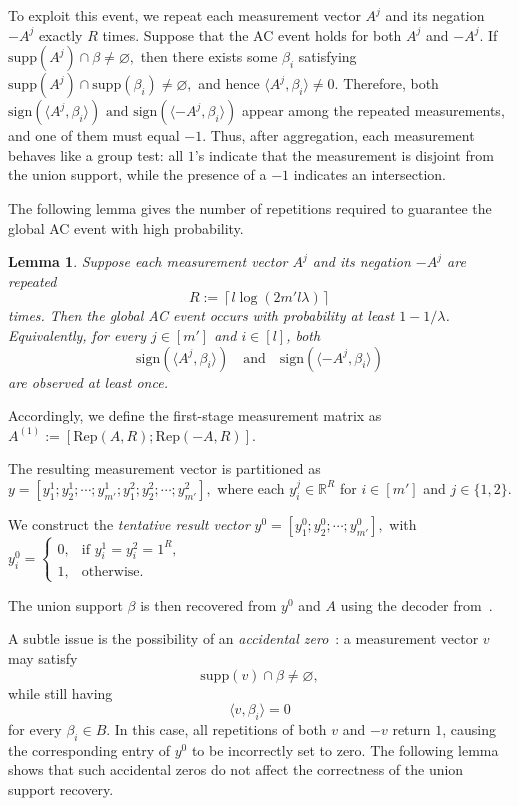 \documentclass{article}
\newtheorem{lemma}{Lemma}[section]
\newcommand{\supp}{\mathrm{supp}}
\newcommand{\sign}{\mathrm{sign}}
\begin{document}
To exploit this event, we repeat each measurement vector $A^j$ and its negation $-A^j$ exactly $R$ times. Suppose that the AC event holds for both $A^j$ and $-A^j$. If
\(
\supp(A^j)\cap\beta\neq\varnothing,
\)
then there exists some $\beta_i$ satisfying
\(
\supp(A^j)\cap\supp(\beta_i)\neq\varnothing,
\)
and hence $\langle A^j,\beta_i\rangle\neq0$. Therefore, both
\(
\sign(\langle A^j,\beta_i\rangle) \text{ and }
\sign(\langle -A^j,\beta_i\rangle)
\)
appear among the repeated measurements, and one of them must equal $-1$. Thus, after aggregation, each measurement behaves like a group test: all $1$'s indicate that the measurement is disjoint from the union support, while the presence of a $-1$ indicates an intersection.

The following lemma gives the number of repetitions required to guarantee the global AC event with high probability.

\begin{lemma}\label{lem:rep1}
Suppose each measurement vector $A^j$ and its negation $-A^j$ are repeated
\[
R:=\left\lceil l\log(2m'l\lambda)\right\rceil
\]
times. Then the global AC event occurs with probability at least $1-1/\lambda$. Equivalently, for every $j\in[m']$ and $i\in[l]$, both
\[
\sign(\langle A^j,\beta_i\rangle)
\quad\text{and}\quad
\sign(\langle -A^j,\beta_i\rangle)
\]
are observed at least once.
\end{lemma}

Accordingly, we define the first-stage measurement matrix as
\(
A^{(1)}:=[\mathrm{Rep}(A,R);\mathrm{Rep}(-A,R)].
\)

The resulting measurement vector is partitioned as
\(
y=[y_1^1;y_2^1;\cdots;y_{m'}^1;
   y_1^2;y_2^2;\cdots;y_{m'}^2],
\)
where each $y_i^j\in\mathbb{R}^R$ for $i\in[m']$ and $j\in\{1,2\}$. 

We construct the \emph{tentative result vector}
\(
y^0=[y_1^0;y_2^0;\cdots;y_{m'}^0],
\)
with
\(
y_i^0=
\begin{cases}
0,&\text{if }y_i^1=y_i^2=1^R,\\
1,&\text{otherwise.}
\end{cases}
\)

The union support $\beta$ is then recovered from $y^0$ and $A$ using the decoder from~\cite{li2025support}.

A subtle issue is the possibility of an \emph{accidental zero}~\cite{li2025support}: a measurement vector $v$ may satisfy
\[
\supp(v)\cap\beta\neq\varnothing,
\]
while still having
\[
\langle v,\beta_i\rangle=0
\]
for every $\beta_i\in B$. In this case, all repetitions of both $v$ and $-v$ return $1$, causing the corresponding entry of $y^0$ to be incorrectly set to zero. The following lemma shows that such accidental zeros do not affect the correctness of the union support recovery.
\end{document}
